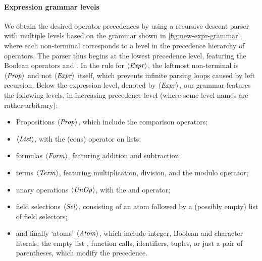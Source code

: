 \paragraph{Expression grammar levels}
We obtain the desired operator precedences by using a recursive descent parser
with multiple levels based on the grammar shown in \cref{fig:new-expr-grammar},
where each non-terminal corresponds to a level in the precedence hierarchy of
operators.
%
The parser thus begins at the lowest precedence level, featuring the Boolean
operators \code{\&\&} and \code{||}.
In the rule for $\langle \textit{Expr}\kern.7pt \rangle$, the leftmost non-terminal is $\langle \textit{Prop}\kern.7pt \rangle$ and not
$\langle \textit{Expr}\kern.7pt \rangle$ itself, which prevents infinite parsing loops caused by left
recursion.
%
Below the expression level, denoted by $\langle \textit{Expr}\kern.7pt \rangle$, our grammar
features the following levels, in increasing precedence level (where some level
names are rather arbitrary):
\begin{itemize}
  \item Propositions $\langle \textit{Prop}\kern.7pt \rangle$, which include the comparison operators;
  \item $\langle \textit{List}\kern.7pt \rangle$, with the \spl{:} (cons) operator on lists;
  \item formulas $\langle \textit{Form}\kern.7pt \rangle$, featuring addition and subtraction;
  \item terms $\langle \textit{Term}\kern.7pt \rangle$, featuring multiplication, division, and the modulo
        operator;
  \item unary operations $\langle \textit{UnOp}\kern.7pt \rangle$, with the \spl{!} and \spl{-} operator;
  \item field selections $\langle \textit{Sel}\kern.7pt \rangle$, consisting of an atom followed by a
        (possibly empty) list of field selectors;
  \item and finally `atoms' $\langle \textit{Atom}\kern.7pt \rangle$, which include integer, Boolean and
        character literals, the empty list \spl{[]}, function calls, identifiers, tuples, or just a pair of
        parentheses, which modify the precedence.
\end{itemize}

